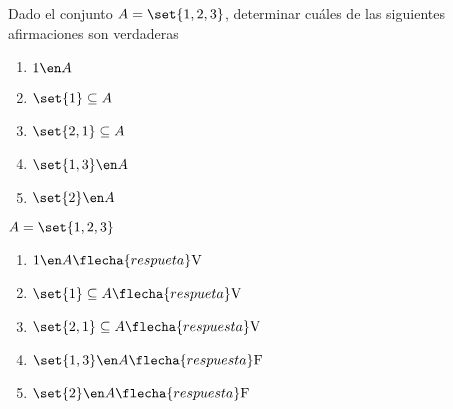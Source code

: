 \ejercicio
Dado el conjunto $A = \set{1,2,3}$, determinar cuáles de las siguientes afirmaciones son verdaderas

\begin{multicols}{5}
	\begin{enumerate}[label=(\roman*)]
		\item $1 \en A $
		\item $\set{1} \subseteq A $
		\item $\set{2,1} \subseteq A $
		\item $\set{1,3} \en A $
		\item $\set{2} \en A $
	\end{enumerate}
\end{multicols}

\separadorCorto

$A = \set{1,2,3}$
\begin{multicols}{2}
	\begin{enumerate}[label=(\roman*)]
		\item $1 \en A \flecha{respueta} \text{V}$
		\item $\set{1} \subseteq A \flecha{respueta} \text{V}$
		\item $\set{2,1} \subseteq A \flecha{respuesta} \text{V}$
		\item $\set{1,3} \en A \flecha{respuesta} \text{F}$
		\item $\set{2} \en A \flecha{respuesta} \text{F}$
	\end{enumerate}
\end{multicols}
